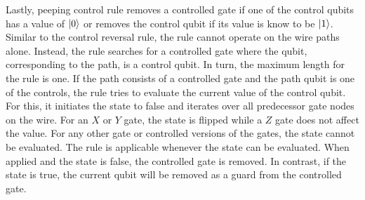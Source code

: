 Lastly, peeping control rule removes a controlled gate if one of the control qubits has a value of $\ket{0}$ or removes the control qubit if its value is know to be $\ket{1}$. Similar to the control reversal rule, the rule cannot operate on the wire paths alone. Instead, the rule searches for a controlled gate where the qubit, corresponding to the path, is a control qubit. In turn, the maximum length for the rule is one. If the path consists of a controlled gate and the path qubit is one of the controls, the rule tries to evaluate the current value of the control qubit. For this, it initiates the state to false and iterates over all predecessor gate nodes on the wire. For an $X$ or $Y$ gate, the state is flipped while a $Z$ gate does not affect the value. For any other gate or controlled versions of the gates, the state cannot be evaluated. The rule is applicable whenever the state can be evaluated. When applied and the state is false, the controlled gate is removed. In contrast, if the state is true, the current qubit will be removed as a guard from the controlled gate. 